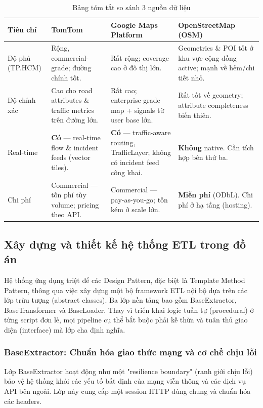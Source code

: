 \begin{table}[H]
\centering
\caption{Bảng tóm tắt so sánh 3 nguồn dữ liệu}
\begin{tabular}{|p{3cm}|p{4cm}|p{4cm}|p{4cm}|}
\hline
\textbf{Tiêu chí} & \textbf{TomTom} & \textbf{Google Maps Platform} & \textbf{OpenStreetMap (OSM)} \\ \hline
Độ phủ (TP.HCM) & Rộng, commercial-grade; đường chính tốt. & Rất rộng; coverage cao ở đô thị lớn. & Geometries \& POI tốt ở khu vực cộng đồng active; mạnh về hẻm/chi tiết nhỏ. \\ \hline
Độ chính xác & Cao cho road attributes \& traffic metrics trên đường lớn. & Rất cao; enterprise-grade map + signals từ user base lớn. & Rất tốt về geometry; attribute completeness biến thiên. \\ \hline
Real-time & \textbf{Có} — real-time flow \& incident feeds (vector tiles). & \textbf{Có} — traffic-aware routing, TrafficLayer; không có incident feed công khai. & \textbf{Không} native. Cần tích hợp bên thứ ba. \\ \hline
Chi phí & Commercial — tốn phí tùy volume; pricing theo API. & Commercial — pay-as-you-go; tốn kém ở scale lớn. & \textbf{Miễn phí} (ODbL). Chi phí ở hạ tầng (hosting). \\ \hline
\end{tabular}
\end{table}

\subsection{Xây dựng và thiết kế hệ thống ETL trong đồ án}
Hệ thống ứng dụng triệt để các Design Pattern, đặc biệt là Template Method Pattern, thông qua việc xây dựng một bộ framework ETL nội bộ dựa trên các lớp trừu tượng (abstract classes). Ba lớp nền tảng bao gồm BaseExtractor, BaseTransformer và BaseLoader. Thay vì triển khai logic tuần tự (procedural) ở từng script đơn lẻ, mọi pipeline cụ thể bắt buộc phải kế thừa và tuân thủ giao diện (interface) mà lớp cha định nghĩa.


\subsubsection{BaseExtractor: Chuẩn hóa giao thức mạng và cơ chế chịu lỗi}
Lớp BaseExtractor hoạt động như một "resilience boundary" (ranh giới chịu lỗi) bảo vệ hệ thống khỏi các yếu tố bất định của mạng viễn thông và các dịch vụ API bên ngoài. Lớp này cung cấp một session HTTP dùng chung và chuẩn hóa các headers.


